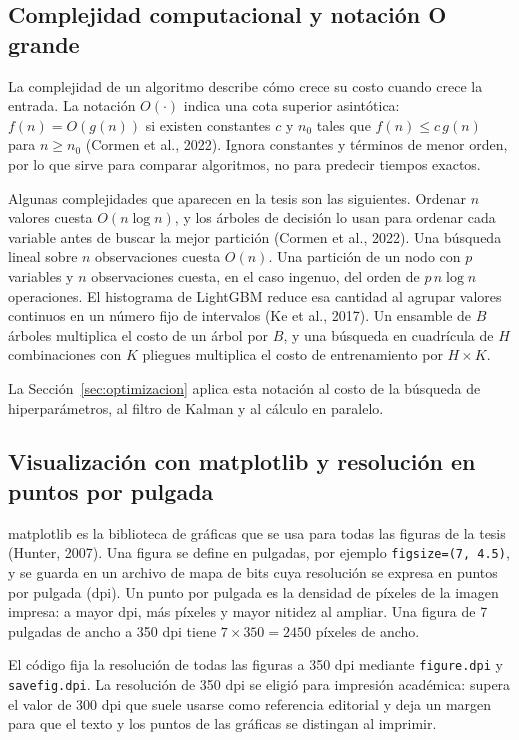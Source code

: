 \subsection{Complejidad computacional y notación O grande}
La complejidad de un algoritmo describe cómo crece su costo cuando crece la entrada. La notación $O(\cdot)$ indica una cota superior asintótica: $f(n)=O(g(n))$ si existen constantes $c$ y $n_0$ tales que $f(n)\leq c\,g(n)$ para $n\geq n_0$ (Cormen et al., 2022). Ignora constantes y términos de menor orden, por lo que sirve para comparar algoritmos, no para predecir tiempos exactos.

Algunas complejidades que aparecen en la tesis son las siguientes. Ordenar $n$ valores cuesta $O(n\log n)$, y los árboles de decisión lo usan para ordenar cada variable antes de buscar la mejor partición (Cormen et al., 2022). Una búsqueda lineal sobre $n$ observaciones cuesta $O(n)$. Una partición de un nodo con $p$ variables y $n$ observaciones cuesta, en el caso ingenuo, del orden de $p\,n\log n$ operaciones. El histograma de LightGBM reduce esa cantidad al agrupar valores continuos en un número fijo de intervalos (Ke et al., 2017). Un ensamble de $B$ árboles multiplica el costo de un árbol por $B$, y una búsqueda en cuadrícula de $H$ combinaciones con $K$ pliegues multiplica el costo de entrenamiento por $H\times K$.

La Sección~\ref{sec:optimizacion} aplica esta notación al costo de la búsqueda de hiperparámetros, al filtro de Kalman y al cálculo en paralelo.

\subsection{Visualización con matplotlib y resolución en puntos por pulgada}
matplotlib es la biblioteca de gráficas que se usa para todas las figuras de la tesis (Hunter, 2007). Una figura se define en pulgadas, por ejemplo \texttt{figsize=(7, 4.5)}, y se guarda en un archivo de mapa de bits cuya resolución se expresa en puntos por pulgada (dpi). Un punto por pulgada es la densidad de píxeles de la imagen impresa: a mayor dpi, más píxeles y mayor nitidez al ampliar. Una figura de 7 pulgadas de ancho a 350 dpi tiene $7\times 350=2450$ píxeles de ancho.

El código fija la resolución de todas las figuras a 350 dpi mediante \texttt{figure.dpi} y \texttt{savefig.dpi}. La resolución de 350 dpi se eligió para impresión académica: supera el valor de 300 dpi que suele usarse como referencia editorial y deja un margen para que el texto y los puntos de las gráficas se distingan al imprimir. %


